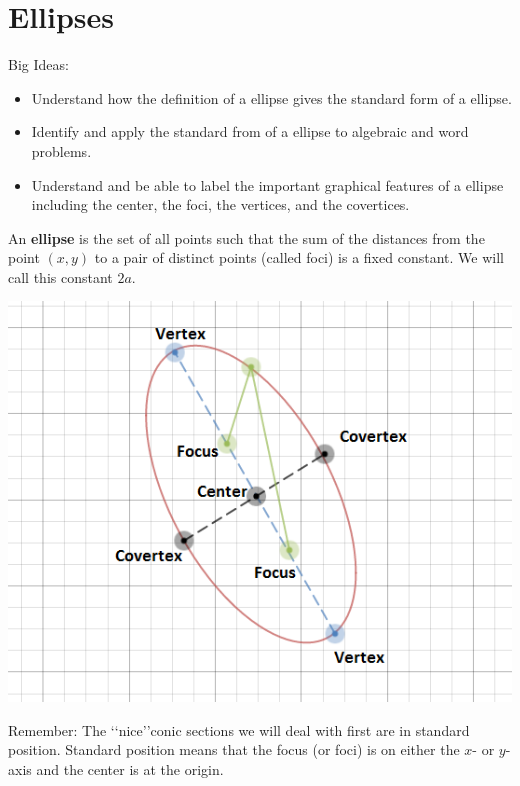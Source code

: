\section{Ellipses}
Big Ideas:
\begin{itemize}
\item Understand how the definition of a ellipse gives the standard form of a ellipse.
\item Identify and apply the standard from of a ellipse to algebraic and word problems.
\item Understand and be able to label the important graphical features of a ellipse including the center, the foci, the vertices, and the covertices.
\end{itemize}
\begin{info} An \textbf{ellipse} is the set of all points such that the sum of the distances from the point $(x,y)$ to a pair of distinct points (called foci) is a fixed constant. We will call this constant $2a$.
\end{info}
\begin{center} \includegraphics[scale=.75]{generalellipse2.png} \end{center}

Remember:  The \lq\lq nice\rq\rq conic sections we will deal with first are in standard position. Standard position means that the focus (or foci) is on either the $x$- or $y$-axis and the center is at the  origin.

